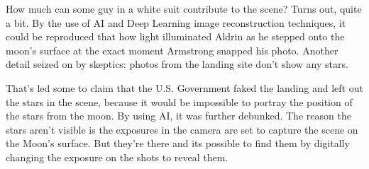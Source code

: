 \documentclass[12pt]{article}
\begin{document}
How much can some guy in a white suit contribute to the scene? Turns out, quite a bit. By the use of AI and Deep Learning image reconstruction techniques, it could be reproduced that how light illuminated Aldrin as he stepped onto the moon’s surface at the exact moment Armstrong snapped his photo.  Another detail seized on by skeptics: photos from the landing site don’t show any stars. 

That’s led some to claim that the U.S. Government faked the landing and left out the stars in the scene, because it would be impossible to portray the position of the stars from the moon. By using AI, it was further debunked. The reason the stars aren’t visible is the exposures in the camera are set to capture the scene on the Moon’s surface. But they’re there and its possible to find them by digitally changing the exposure on the shots to reveal them. 
\end{document}
